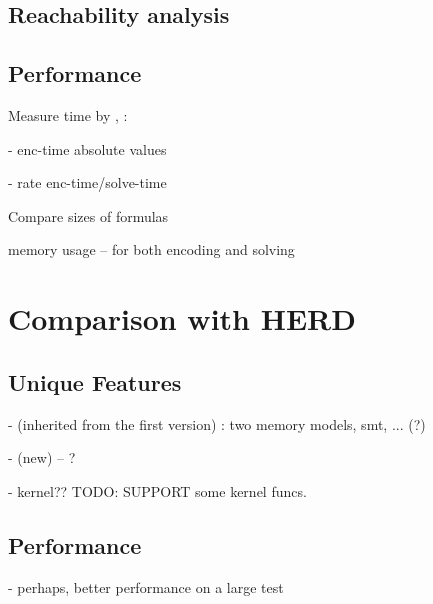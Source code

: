 \subsection{Reachability analysis}




\subsection{Performance}

Measure time by \porthos[1], \porthos[2]:

- enc-time absolute values

- rate enc-time/solve-time


Compare sizes of formulas


memory usage -- for both encoding and solving




\section{Comparison with HERD}

\subsection{Unique Features}

- (inherited from the first version) : two memory models, smt, ... (?)

- (new) -- ?

- kernel?? TODO: SUPPORT some kernel funcs.


\subsection{Performance}

- perhaps, better performance on a large test